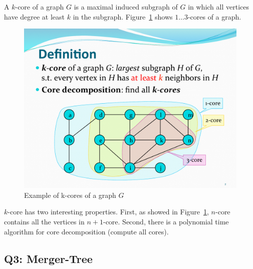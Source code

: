 A $k$-core of a graph $G$ is a maximal induced subgraph of $G$ in which all
vertices have degree at least $k$ in the subgraph. 
Figure~\ref{fig:k-core_example} shows $1 \ldots 3$-cores of a graph. 

\begin{figure}[t]
    \centering
    \includegraphics[width=0.9\linewidth]{images/kcore.pdf}
    \caption{Example of k-cores of a graph $G$}
    \label{fig:k-core_example}
\end{figure}

$k$-core has two interesting properties. First, as showed in 
Figure~\ref{fig:k-core_example}, $n$-core contains all the vertices 
in $n+1$-core. Second, there is a polynomial time algorithm for 
core decomposition (compute all cores).

\subsection{Q3: Merger-Tree}


